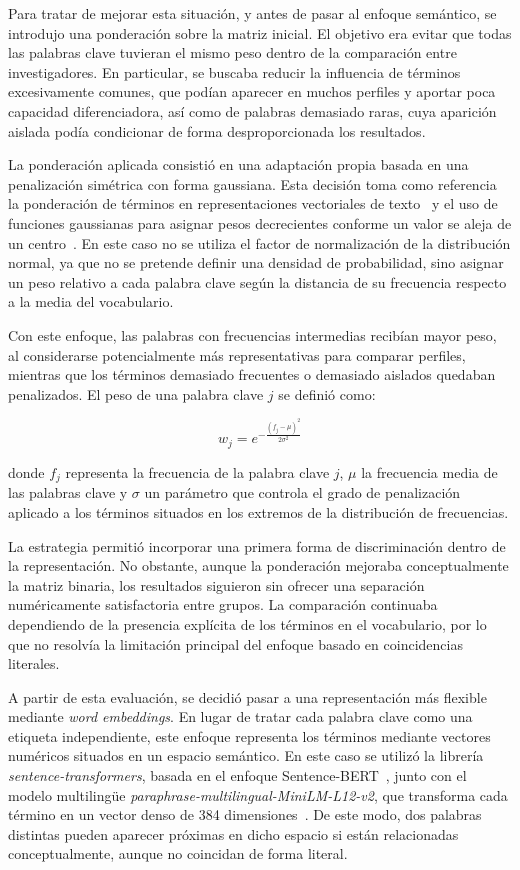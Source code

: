 \documentclass[11pt,spanish,listoffigures,listoftables]{tfgetsinf}
\begin{document}
Para tratar de mejorar esta situación, y antes de pasar al enfoque semántico, se introdujo una ponderación sobre la matriz inicial. El objetivo era evitar que todas las palabras clave tuvieran el mismo peso dentro de la comparación entre investigadores. En particular, se buscaba reducir la influencia de términos excesivamente comunes, que podían aparecer en muchos perfiles y aportar poca capacidad diferenciadora, así como de palabras demasiado raras, cuya aparición aislada podía condicionar de forma desproporcionada los resultados.

La ponderación aplicada consistió en una adaptación propia basada en una penalización simétrica con forma gaussiana. Esta decisión toma como referencia la ponderación de términos en representaciones vectoriales de texto~\cite{salton} y el uso de funciones gaussianas para asignar pesos decrecientes conforme un valor se aleja de un centro~\cite{gaussian_function}. En este caso no se utiliza el factor de normalización de la distribución normal, ya que no se pretende definir una densidad de probabilidad, sino asignar un peso relativo a cada palabra clave según la distancia de su frecuencia respecto a la media del vocabulario.

Con este enfoque, las palabras con frecuencias intermedias recibían mayor peso, al considerarse potencialmente más representativas para comparar perfiles, mientras que los términos demasiado frecuentes o demasiado aislados quedaban penalizados. El peso de una palabra clave \(j\) se definió como:

\[
w_j = e^{-\frac{(f_j - \mu)^2}{2\sigma^2}}
\]

donde \(f_j\) representa la frecuencia de la palabra clave \(j\), \(\mu\) la frecuencia media de las palabras clave y \(\sigma\) un parámetro que controla el grado de penalización aplicado a los términos situados en los extremos de la distribución de frecuencias.

La estrategia permitió incorporar una primera forma de discriminación dentro de la representación. No obstante, aunque la ponderación mejoraba conceptualmente la matriz binaria, los resultados siguieron sin ofrecer una separación numéricamente satisfactoria entre grupos. La comparación continuaba dependiendo de la presencia explícita de los términos en el vocabulario, por lo que no resolvía la limitación principal del enfoque basado en coincidencias literales.

A partir de esta evaluación, se decidió pasar a una representación más flexible mediante \textit{word embeddings}. En lugar de tratar cada palabra clave como una etiqueta independiente, este enfoque representa los términos mediante vectores numéricos situados en un espacio semántico. En este caso se utilizó la librería \textit{sentence-transformers}, basada en el enfoque Sentence-BERT~\cite{sentencebert}, junto con el modelo multilingüe \textit{paraphrase-multilingual-MiniLM-L12-v2}, que transforma cada término en un vector denso de 384 dimensiones~\cite{minilm_multilingual}. De este modo, dos palabras distintas pueden aparecer próximas en dicho espacio si están relacionadas conceptualmente, aunque no coincidan de forma literal.
\end{document}
